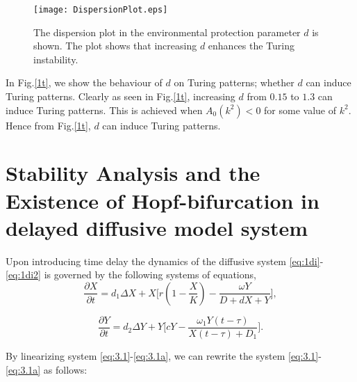 \documentclass[10pt]{amsart}
\theoremstyle{definition}
\begin{document}
\begin{figure}[htb]
{
\texttt{[image: DispersionPlot.eps]}}
\caption{The dispersion plot in the environmental protection parameter $d$ is shown. The plot shows that increasing $d$ enhances the Turing instability.}
\label{1t}
\end{figure}

In Fig.\eqref{1t}, we show the behaviour of $d$ on Turing patterns; whether $d$ can induce Turing patterns. Clearly as seen in Fig.\eqref{1t}, increasing $d$ from $0.15$ to $1.3$ can induce Turing patterns. This is achieved when $A_0(k^2)<0$ for some value of $k^2$. Hence from Fig.\eqref{1t}, $d$ can induce Turing patterns.

\section{Stability Analysis and the Existence of Hopf-bifurcation in delayed diffusive model system}
\label{sec:3}

Upon introducing time delay the dynamics of the diffusive system \eqref{eq:1di}-\eqref{eq:1di2} is governed by the following
systems of equations,
\begin{equation}\label{eq:3.1}
\frac{\partial X}{\partial t}=d_1 \Delta X + X\Bigg[r\left(1-\frac{X}{K}\right)-\frac{\omega  Y}{D+dX+Y}\Bigg],
\end{equation}

\begin{equation}\label{eq:3.1a}
\frac{\partial Y}{\partial t}=d_2 \Delta Y + Y\Bigg[cY-\frac{\omega_1 Y(t-\tau)}{X(t-\tau)+D_1}\Bigg].
\end{equation}

By linearizing system \eqref{eq:3.1}-\eqref{eq:3.1a}, we can rewrite the system \eqref{eq:3.1}-\eqref{eq:3.1a} as follows:
\end{document}
